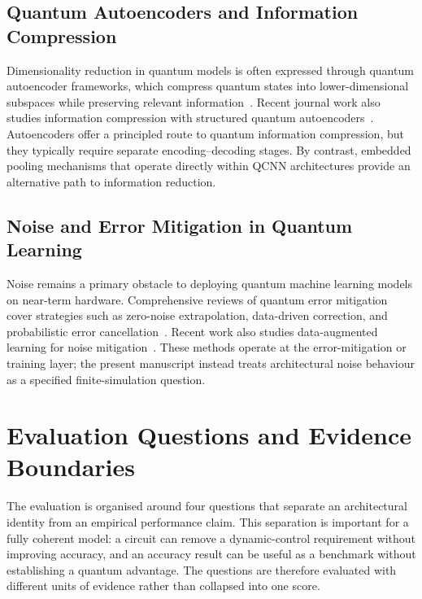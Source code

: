 \documentclass[conference]{IEEEtran}
\begin{document}
\subsection{Quantum Autoencoders and Information Compression}
Dimensionality reduction in quantum models is often expressed through quantum autoencoder frameworks, which compress quantum states into lower-dimensional subspaces while preserving relevant information~\cite{ref25,ref26}. Recent journal work also studies information compression with structured quantum autoencoders~\cite{ref23}. Autoencoders offer a principled route to quantum information compression, but they typically require separate encoding--decoding stages. By contrast, embedded pooling mechanisms that operate directly within QCNN architectures provide an alternative path to information reduction.

\subsection{Noise and Error Mitigation in Quantum Learning}
Noise remains a primary obstacle to deploying quantum machine learning models on near-term hardware. Comprehensive reviews of quantum error mitigation cover strategies such as zero-noise extrapolation, data-driven correction, and probabilistic error cancellation~\cite{ref22}. Recent work also studies data-augmented learning for noise mitigation~\cite{ref16}. These methods operate at the error-mitigation or training layer; the present manuscript instead treats architectural noise behaviour as a specified finite-simulation question.

\section{Evaluation Questions and Evidence Boundaries}
The evaluation is organised around four questions that separate an
architectural identity from an empirical performance claim. This separation is
important for a fully coherent model: a circuit can remove a dynamic-control
requirement without improving accuracy, and an accuracy result can be useful as
a benchmark without establishing a quantum advantage. The questions are
therefore evaluated with different units of evidence rather than collapsed into
one score.
\end{document}
